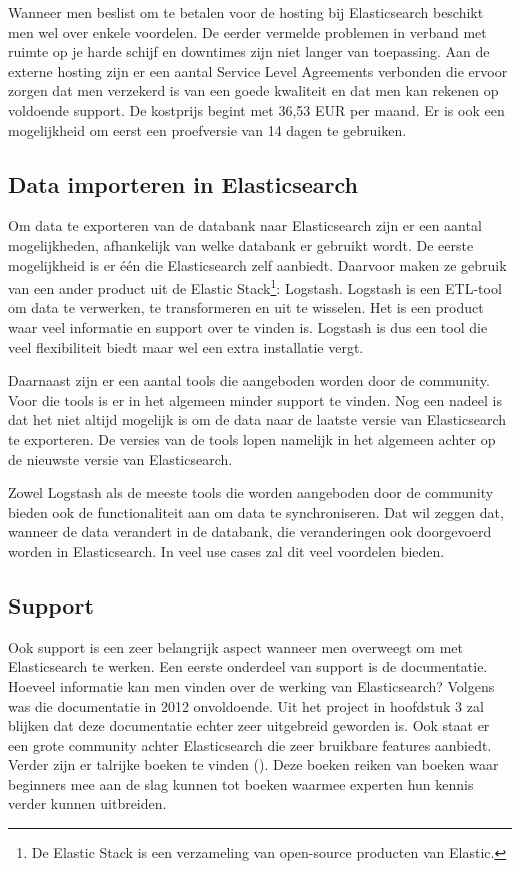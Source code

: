 Wanneer men beslist om te betalen voor de hosting bij Elasticsearch beschikt men wel over enkele voordelen. De eerder vermelde problemen in verband met ruimte op je harde schijf en downtimes zijn niet langer van toepassing. Aan de externe hosting zijn er een aantal Service Level Agreements verbonden die ervoor zorgen dat men verzekerd is van een goede kwaliteit en dat men kan rekenen op voldoende support. De kostprijs begint met 36,53 EUR per maand. Er is ook een mogelijkheid om eerst een proefversie van 14 dagen te gebruiken.

\subsection{Data importeren in Elasticsearch}

Om data te exporteren van de databank naar Elasticsearch zijn er een aantal mogelijkheden, afhankelijk van welke databank er gebruikt wordt. De eerste mogelijkheid is er één die Elasticsearch zelf aanbiedt. Daarvoor maken ze gebruik van een ander product uit de Elastic Stack\footnote{De Elastic Stack is een verzameling van open-source producten van Elastic.}: Logstash. Logstash is een ETL-tool om data te verwerken, te transformeren en uit te wisselen. Het is een product waar veel informatie en support over te vinden is. Logstash is dus een tool die veel flexibiliteit biedt maar wel een extra installatie vergt. 

Daarnaast zijn er een aantal tools die aangeboden worden door de community. Voor die tools is er in het algemeen minder support te vinden. Nog een nadeel is dat het niet altijd mogelijk is om de data naar de laatste versie van Elasticsearch te exporteren. De versies van de tools lopen namelijk in het algemeen achter op de nieuwste versie van Elasticsearch. 

Zowel Logstash als de meeste tools die worden aangeboden door de community bieden ook de functionaliteit aan om data te synchroniseren. Dat wil zeggen dat, wanneer de data verandert in de databank, die veranderingen ook doorgevoerd worden in Elasticsearch. In veel use cases zal dit veel voordelen bieden. 

\subsection{Support}

Ook support is een zeer belangrijk aspect wanneer men overweegt om met Elasticsearch te werken. Een eerste onderdeel van support is de documentatie. Hoeveel informatie kan men vinden over de werking van Elasticsearch? Volgens \textcite{Glauner2012} was die documentatie in 2012 onvoldoende. Uit het project in hoofdstuk 3 zal blijken dat deze documentatie echter zeer uitgebreid geworden is. Ook staat er een grote community achter Elasticsearch die zeer bruikbare features aanbiedt. Verder zijn er talrijke boeken te vinden (\textcite{Turner}). Deze boeken reiken van boeken waar beginners mee aan de slag kunnen tot boeken waarmee experten hun kennis verder kunnen uitbreiden.

